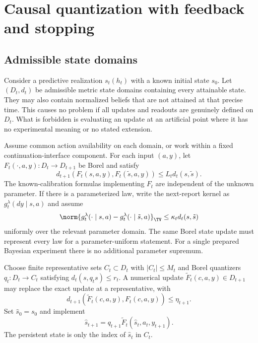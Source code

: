 \section{Causal quantization with feedback and stopping}\label{sec:emulation}
\subsection{Admissible state domains}
Consider a predictive realization $s_t(h_t)$ with a known initial state
$s_0$. Let $(D_t,d_t)$ be admissible metric state domains containing every
attainable state. They may also contain normalized beliefs that are not
attained at that precise time. This causes no problem if all updates and
readouts are genuinely defined on $D_t$. What is forbidden is evaluating an
update at an artificial point where it has no experimental meaning or no
stated extension.

Assume common action availability on each domain, or work within a fixed
continuation-interface component. For each input $(a,y)$, let
$F_t(\cdot,a,y):D_t\to D_{t+1}$ be Borel and satisfy
\begin{equation}\label{eq:update-lip}
 d_{t+1}(F_t(s,a,y),F_t(\tilde s,a,y))\le L_td_t(s,\tilde s).
\end{equation}
The known-calibration formulas implementing $F_t$ are independent of the
unknown parameter. If there is a parameterized law, write the next-report
kernel as $g_t^\lambda(dy\mid s,a)$ and assume
\begin{equation}\label{eq:report-lip}
 \norm{g_t^\lambda(\cdot\mid s,a)-g_t^\lambda(\cdot\mid\tilde s,a)}_{\TV}
 \le\kappa_td_t(s,\tilde s)
\end{equation}
uniformly over the relevant parameter domain. The same Borel state update
must represent every law for a parameter-uniform statement. For a single
prepared Bayesian experiment there is no additional parameter supremum.

Choose finite representative sets $C_t\subset D_t$ with $|C_t|\le M_t$
and Borel quantizers $q_t:D_t\to C_t$ satisfying
$d_t(s,q_ts)\le r_t$. A numerical update
$\widetilde F_t(c,a,y)\in D_{t+1}$ may replace the exact update at a
representative, with
\begin{equation}\label{eq:update-numerics}
 d_{t+1}(\widetilde F_t(c,a,y),F_t(c,a,y))\le\eta_{t+1}.
\end{equation}
Set $\hat s_0=s_0$ and implement
\begin{equation}\label{eq:finite-machine}
 \hat s_{t+1}=q_{t+1}\widetilde F_t(\hat s_t,a_t,y_{t+1}).
\end{equation}
The persistent state is only the index of $\hat s_t$ in $C_t$.

